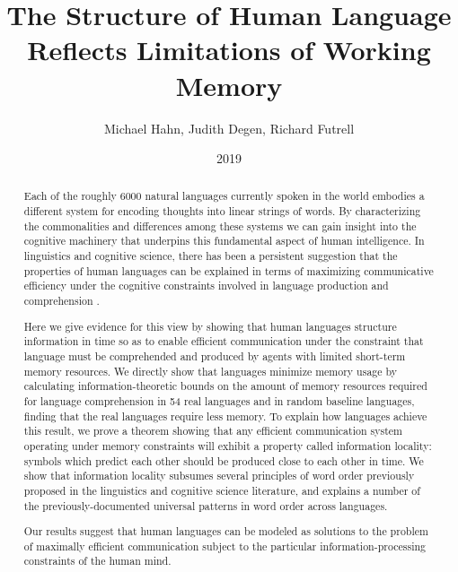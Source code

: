 \documentclass[12pt]{article}
\title{The Structure of Human Language Reflects Limitations of Working Memory}
\author{Michael Hahn, Judith Degen, Richard Futrell}
\date{2019}
\date{}
\newcounter{theorem}
\begin{document}
\baselineskip24pt


\maketitle

\begin{abstract}
  Each of the roughly 6000 natural languages currently spoken in the world embodies a different system for encoding thoughts into linear strings of words.
  By characterizing the commonalities and differences among these systems we can gain insight into the cognitive machinery that underpins this fundamental aspect of human intelligence. 
  In linguistics and cognitive science, there has been a persistent suggestion that the properties of human languages can be explained in terms of maximizing communicative efficiency under the cognitive constraints involved in language production and comprehension \citep{gibson2019efficiency,florian,hawkins,piantadosi2011word,zipf1949}.

  Here we give evidence for this view by showing that human languages structure information in time so as to enable efficient communication under the constraint that language must be comprehended and produced by agents with limited short-term memory resources.
  We directly show that languages minimize memory usage by calculating information-theoretic bounds on the amount of memory resources required for language comprehension in 54 real languages and in random baseline languages, finding that the real languages require less memory.
  To explain how languages achieve this result, we prove a theorem showing that any efficient communication system operating under memory constraints will exhibit a property called information locality: symbols which predict each other should be produced close to each other in time.
  We show that information locality subsumes several principles of word order previously proposed in the linguistics and cognitive science literature, and explains a number of the previously-documented universal patterns in word order across languages.
  
  Our results suggest that human languages can be modeled as solutions to the problem of maximally efficient communication subject to the particular information-processing constraints of the human mind. 
\end{abstract}
\end{document}
